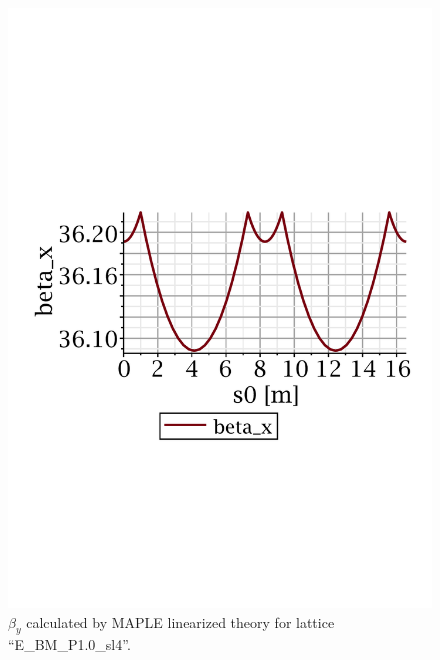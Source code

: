 \documentclass[]{article}
\begin{document}
\begin{figure}[htbp]
\begin{minipage}[b]{0.49\linewidth}
\includegraphics[scale=0.45]{pdf/E_BM_P1p0_2-betax.pdf}
\caption{$\beta_y$ calculated by MAPLE linearized 
theory for lattice ``E\_BM\_P1.0\_sl4''.}
\label{fig:RT_P1.0_betax}
\end{minipage}
\end{figure}
%
%
\end{document}
